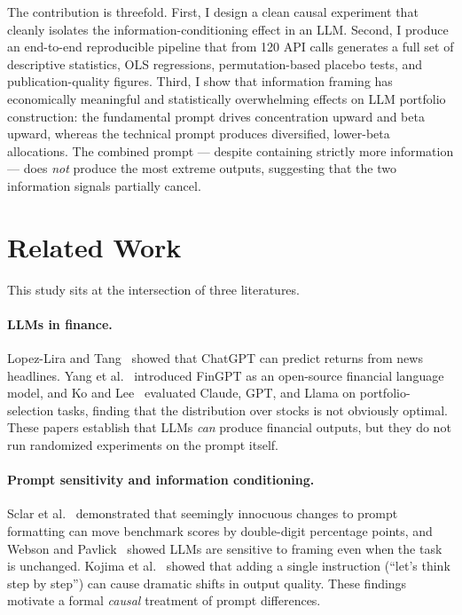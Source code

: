 \documentclass[11pt]{article}
\begin{document}
The contribution is threefold. First, I design a clean causal experiment
that cleanly isolates the information-conditioning effect in an LLM. Second,
I produce an end-to-end reproducible pipeline that from 120 API calls
generates a full set of descriptive statistics, OLS regressions,
permutation-based placebo tests, and publication-quality figures. Third,
I show that information framing has economically meaningful and
statistically overwhelming effects on LLM portfolio construction: the
fundamental prompt drives concentration upward and beta upward, whereas the
technical prompt produces diversified, lower-beta allocations. The combined
prompt --- despite containing strictly more information --- does \emph{not}
produce the most extreme outputs, suggesting that the two information
signals partially cancel.

\section{Related Work}

This study sits at the intersection of three literatures.

\paragraph{LLMs in finance.} Lopez-Lira and Tang~\cite{Lopez-Lira2023} showed that ChatGPT can
predict returns from news headlines. Yang et al.~\cite{Yang2023} introduced FinGPT as
an open-source financial language model, and Ko and Lee~\cite{Ko2024} evaluated
Claude, GPT, and Llama on portfolio-selection tasks, finding that the
distribution over stocks is not obviously optimal. These papers establish
that LLMs \emph{can} produce financial outputs, but they do not run
randomized experiments on the prompt itself.

\paragraph{Prompt sensitivity and information conditioning.}
Sclar et al.~\cite{Sclar2024} demonstrated that seemingly innocuous changes to prompt
formatting can move benchmark scores by double-digit percentage points, and
Webson and Pavlick~\cite{Webson2022} showed LLMs are sensitive to framing even when the task
is unchanged. Kojima et al.~\cite{Kojima2022} showed that adding a single instruction
(``let's think step by step'') can cause dramatic shifts in output quality.
These findings motivate a formal \emph{causal} treatment of prompt
differences.
\end{document}
